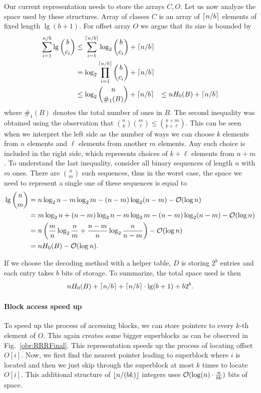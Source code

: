 Our current representation needs to store the arrays $C, O$. Let us now analyze the space used by these structures.
Array of classes $C$ is an array of $\left\lceil n/b \right\rceil$ elements of fixed length $\lg (b+1)$. For offset array $O$ we argue
that its size is bounded by
\begin{align*}
    \sum_{i=1}^{n/b} \mathop{\mathrm{lg}} {b\choose c_i}
    &\leq \sum_{i=1}^{\left\lceil n/b \right\rceil} \log_2 {b\choose c_i} + \left\lceil n/b \right\rceil \\
    &= \log_2\prod_{i=1}^{\left\lceil n/b \right\rceil} {b\choose c_i} + \left\lceil n/b \right\rceil \\
    &\leq \log_2{n\choose \#_1(B)} + \left\lceil n/b \right\rceil &\leq nH_0(B) + \left\lceil n/b \right\rceil
\end{align*}
where $\#_1(B)$ denotes the total number of ones in $B$. The second inequality was obtained using
the observation that ${n\choose k} {m\choose \ell} \leq {n+m\choose k+\ell}$. This can be seen
when we interpret the left side as the number of ways we can choose $k$ elements
from $n$ elements and $\ell$ elements from another $m$ elements. Any such choice is included in the
right side, which represents choices of $k+\ell$ elements from $n+m$. To understand the last inequality,
consider all binary sequences of length $n$ with $m$ ones. There are ${n\choose m}$ such sequences,
thus in the worst case, the space we need to represent a single one of these sequences is equal to
\begin{align*}
    \mathop{\mathrm{lg}}{n\choose m}
    &= n\log_2 n - m\log_2 m - (n-m)\log_2 (n-m) - \mathcal{O}(\log n) \\
    &= m\log_2 n + (n-m)\log_2 n - m\log_2 m - (n-m)\log_2 (n-m) - \mathcal{O}(\log n) \\
    &= n\left(\frac{m}{n}\log_2\frac{n}{m} + \frac{n-m}{n}\log_2\frac{n}{n-m}\right)-\mathcal{O}(\log n) \\
    &= nH_0(B) - \mathcal{O}(\log n).
\end{align*}

If we choose the decoding method with a helper table, $D$ is storing $2^b$ entries and each entry takes
$b$ bits of storage. To summarize, the total space used is then
$$nH_0(B) + \left\lceil n/b \right\rceil + \left\lceil n/b \right\rceil \cdot \mathop{\mathrm{lg}}(b+1) + b2^b.$$

\paragraph{Block access speed up}

To speed up the process of accessing blocks, we can store pointers to every $k$-th element
of $O$. This again creates some bigger superblocks as can be observed in Fig.~\ref{obr:RRRFinal}.
This representation speeds up the process of locating offset $O[i]$. Now, we first find the
nearest pointer leading to superblock where $i$ is located and then we just skip through the superblock
at most $k$ times to locate $O[i]$. This additional structure of $\left\lfloor n/(bk) \right\rfloor$ integers uses
$\mathcal{O}(\log(n)\cdot \frac{n}{bk})$ bits of space.


